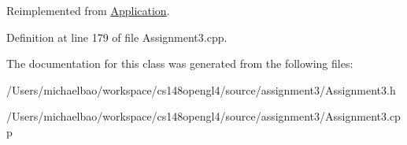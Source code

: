 Reimplemented from \hyperlink{class_application_a0800afd5651153d31fa775a8048d14dd}{Application}.



Definition at line 179 of file Assignment3.\+cpp.



The documentation for this class was generated from the following files\+:\begin{DoxyCompactItemize}
\item 
/\+Users/michaelbao/workspace/cs148opengl4/source/assignment3/Assignment3.\+h\item 
/\+Users/michaelbao/workspace/cs148opengl4/source/assignment3/Assignment3.\+cpp\end{DoxyCompactItemize}
